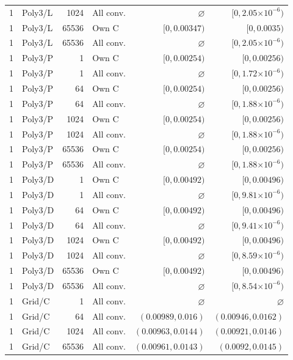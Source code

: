 \begin{longtable}{llrlrr}
1 & Poly3/L & 1024 & All conv. & $\varnothing$ & $[0, 2.05\mathord{\times}10^{-6})$ \\
1 & Poly3/L & 65536 & Own C & $[0, 0.00347)$ & $[0, 0.0035)$ \\
1 & Poly3/L & 65536 & All conv. & $\varnothing$ & $[0, 2.05\mathord{\times}10^{-6})$ \\
1 & Poly3/P & 1 & Own C & $[0, 0.00254)$ & $[0, 0.00256)$ \\
1 & Poly3/P & 1 & All conv. & $\varnothing$ & $[0, 1.72\mathord{\times}10^{-6})$ \\
1 & Poly3/P & 64 & Own C & $[0, 0.00254)$ & $[0, 0.00256)$ \\
1 & Poly3/P & 64 & All conv. & $\varnothing$ & $[0, 1.88\mathord{\times}10^{-6})$ \\
1 & Poly3/P & 1024 & Own C & $[0, 0.00254)$ & $[0, 0.00256)$ \\
1 & Poly3/P & 1024 & All conv. & $\varnothing$ & $[0, 1.88\mathord{\times}10^{-6})$ \\
1 & Poly3/P & 65536 & Own C & $[0, 0.00254)$ & $[0, 0.00256)$ \\
1 & Poly3/P & 65536 & All conv. & $\varnothing$ & $[0, 1.88\mathord{\times}10^{-6})$ \\
1 & Poly3/D & 1 & Own C & $[0, 0.00492)$ & $[0, 0.00496)$ \\
1 & Poly3/D & 1 & All conv. & $\varnothing$ & $[0, 9.81\mathord{\times}10^{-6})$ \\
1 & Poly3/D & 64 & Own C & $[0, 0.00492)$ & $[0, 0.00496)$ \\
1 & Poly3/D & 64 & All conv. & $\varnothing$ & $[0, 9.41\mathord{\times}10^{-6})$ \\
1 & Poly3/D & 1024 & Own C & $[0, 0.00492)$ & $[0, 0.00496)$ \\
1 & Poly3/D & 1024 & All conv. & $\varnothing$ & $[0, 8.59\mathord{\times}10^{-6})$ \\
1 & Poly3/D & 65536 & Own C & $[0, 0.00492)$ & $[0, 0.00496)$ \\
1 & Poly3/D & 65536 & All conv. & $\varnothing$ & $[0, 8.54\mathord{\times}10^{-6})$ \\
1 & Grid/C & 1 & All conv. & $\varnothing$ & $\varnothing$ \\
1 & Grid/C & 64 & All conv. & $(0.00989, 0.016)$ & $(0.00946, 0.0162)$ \\
1 & Grid/C & 1024 & All conv. & $(0.00963, 0.0144)$ & $(0.00921, 0.0146)$ \\
1 & Grid/C & 65536 & All conv. & $(0.00961, 0.0143)$ & $(0.0092, 0.0145)$ \\

\end{longtable}
